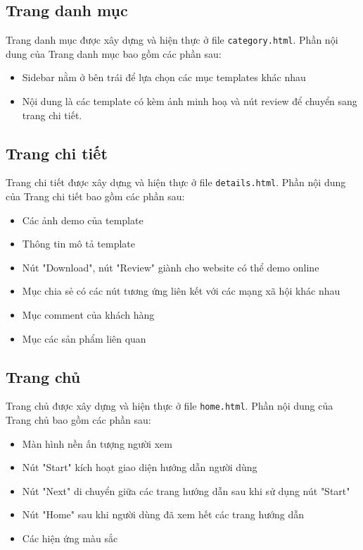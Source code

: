 \documentclass[a4paper]{article}
\begin{document}
\subsection{Trang danh mục}
Trang danh mục được xây dựng và hiện thực ở file \texttt{category.html}. Phần nội dung của Trang danh mục bao gồm các phần sau:
\begin{itemize}
    \item Sidebar nằm ở bên trái để lựa chọn các mục templates khác nhau
    \item Nội dung là các template có kèm ảnh minh hoạ và nút review để chuyển sang trang chi tiết.
\end{itemize}

\subsection{Trang chi tiết}
Trang chi tiết được xây dựng và hiện thực ở file \texttt{details.html}. Phần nội dung của Trang chi tiết bao gồm các phần sau:
\begin{itemize}
    \item Các ảnh demo của template
    \item Thông tin mô tả template
    \item Nút "Download", nút "Review" giành cho website có thể demo online
    \item Mục chia sẻ có các nút tương ứng liên kết với các mạng xã hội khác nhau
    \item Mục comment của khách hàng
    \item Mục các sản phẩm liên quan
\end{itemize}

\subsection{Trang chủ}
Trang chủ được xây dựng và hiện thực ở file \texttt{home.html}. Phần nội dung của Trang chủ bao gồm các phần sau:
\begin{itemize}
    \item Màn hình nền ấn tượng người xem
    \item Nút "Start" kích hoạt giao diện hướng dẫn người dùng
    \item Nút "Next" di chuyển giữa các trang hướng dẫn sau khi sử dụng nút "Start"
    \item Nút "Home" sau khi người dùng đã xem hết các trang hướng dẫn
    \item Các hiện ứng màu sắc
\end{itemize}
\end{document}

